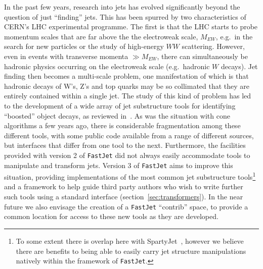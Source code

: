 \documentclass[12pt,a4]{article}
\newcommand{\fastjet}{\texttt{FastJet}\xspace}
\begin{document}
In the past few years, research into jets has evolved significantly
beyond the question of just ``finding'' jets.
%
This has been spurred by two characteristics of CERN's LHC
experimental programme.
%
The first is that the LHC starts to probe momentum scales that are far
above the the electroweak scale, $M_{EW}$, e.g.\ in the search for new
particles or the study of high-energy $WW$ scattering.
%
However, even in events with transverse momenta $\gg M_{EW}$, there can
simultaneously be hadronic physics occurring on the electroweak scale
(e.g.\ hadronic $W$ decays).
%
Jet finding then becomes a multi-scale problem, one manifestation of
which is that hadronic decays of W's, Z's and top quarks may be so
collimated that they are entirely contained within a single jet.
%
The study of this kind of problem has led to the development of a wide
array of jet substructure tools for identifying ``boosted'' object
decays, as reviewed in~\cite{Abdesselam:2010pt}.
%
As was the situation with cone algorithms a few years ago, there is
considerable fragmentation among these different tools, with some
public code available from a range of different sources, but
interfaces that differ from one tool to the next.
%
Furthermore, the facilities provided with version 2 of \fastjet did not
always easily accommodate tools to manipulate and transform jets.
%
Version 3 of \fastjet aims to improve this situation, providing 
implementations of the most common jet substructure tools\footnote{To
  some extent there is overlap here with SpartyJet~\cite{SpartyJet},
  however we believe there are benefits to being able to easily carry
  jet structure manipulations natively within the framework of
  \fastjet.} and a framework to help guide third party authors who wish
to write further such tools using a standard interface
(section~\ref{sec:transformers}).
%
In the near future we also envisage the creation of a \fastjet
``contrib'' space, to provide a common location for access to these
new tools as they are developed.
\end{document}
